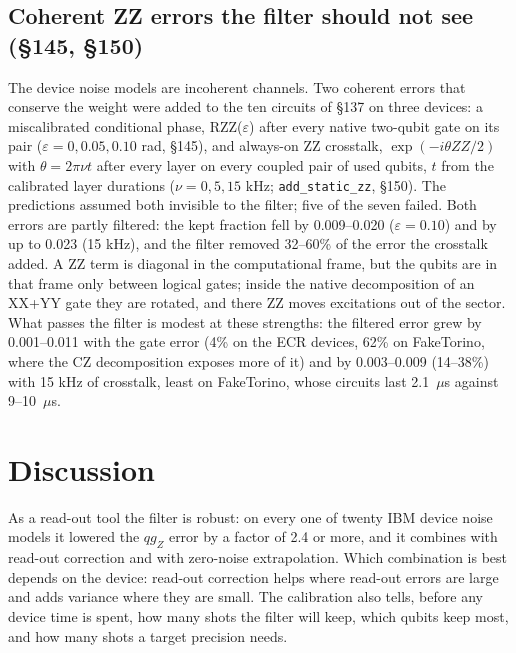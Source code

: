 \documentclass[11pt]{article}
\newcommand{\qZ}{qg_Z}
\begin{document}
\subsection{Coherent ZZ errors the filter should not see (§145, §150)}

The device noise models are incoherent channels. Two coherent errors that conserve the weight were added
to the ten circuits of §137 on three devices: a miscalibrated conditional phase, RZZ($\varepsilon$) after
every native two-qubit gate on its pair ($\varepsilon=0,0.05,0.10$ rad, §145), and always-on ZZ crosstalk,
$\exp(-i\theta ZZ/2)$ with $\theta=2\pi\nu t$ after every layer on every coupled pair of used qubits, $t$ from
the calibrated layer durations ($\nu=0,5,15$ kHz; \texttt{add\_static\_zz}, §150). The predictions assumed both
invisible to the filter; five of the seven failed. Both errors are partly filtered: the kept fraction fell
by 0.009--0.020 ($\varepsilon=0.10$) and by up to 0.023 (15 kHz), and the filter removed 32--60\% of the error
the crosstalk added. A ZZ term is diagonal in the computational frame, but the qubits are in that frame only
between logical gates; inside the native decomposition of an XX+YY gate they are rotated, and there ZZ moves
excitations out of the sector. What passes the filter is modest at these strengths: the filtered error grew by
0.001--0.011 with the gate error (4\% on the ECR devices, 62\% on FakeTorino, where the CZ decomposition exposes
more of it) and by 0.003--0.009 (14--38\%) with 15 kHz of crosstalk, least on FakeTorino, whose circuits last
2.1~$\mu$s against 9--10~$\mu$s.

\section{Discussion}

As a read-out tool the filter is robust: on every one of twenty IBM device noise models it lowered the $\qZ$
error by a factor of 2.4 or more, and it combines with read-out correction and with zero-noise extrapolation.
Which combination is best depends on the device: read-out correction helps where read-out errors are large
and adds variance where they are small. The calibration also tells, before any device time is spent, how many
shots the filter will keep, which qubits keep most, and how many shots a target precision needs.
\end{document}
